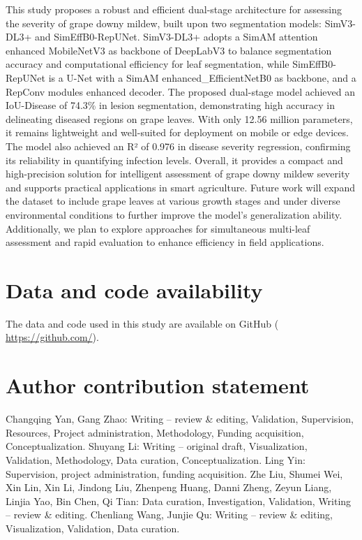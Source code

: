 \documentclass[
]{article}
\begin{document}
This study proposes a robust and efficient dual-stage architecture for
assessing the severity of grape downy mildew, built upon two
segmentation models: SimV3-DL3+ and SimEffB0-RepUNet. SimV3-DL3+ adopts
a SimAM attention enhanced MobileNetV3 as backbone of DeepLabV3 to
balance segmentation accuracy and computational efficiency for leaf
segmentation, while SimEffB0-RepUNet is a U-Net with a SimAM
enhanced\_EfficientNetB0 as backbone, and a RepConv modules enhanced
decoder. The proposed dual-stage model achieved an IoU-Disease of 74.3\%
in lesion segmentation, demonstrating high accuracy in delineating
diseased regions on grape leaves. With only 12.56 million parameters, it
remains lightweight and well-suited for deployment on mobile or edge
devices. The model also achieved an R² of 0.976 in disease severity
regression, confirming its reliability in quantifying infection levels.
Overall, it provides a compact and high-precision solution for
intelligent assessment of grape downy mildew severity and supports
practical applications in smart agriculture. Future work will expand the
dataset to include grape leaves at various growth stages and under
diverse environmental conditions to further improve the model's
generalization ability. Additionally, we plan to explore approaches for
simultaneous multi-leaf assessment and rapid evaluation to enhance
efficiency in field applications.

\hypertarget{data-and-code-availability}{%
\section{Data and code availability}\label{data-and-code-availability}}

The data and code used in this study are available on GitHub (
\href{https://github.com/husnxjsjsb/Grape-Downy}{https://github.com/}).

\hypertarget{author-contribution-statement}{%
\section{Author contribution
statement}\label{author-contribution-statement}}

Changqing Yan, Gang Zhao: Writing -- review \& editing, Validation,
Supervision, Resources, Project administration, Methodology, Funding
acquisition, Conceptualization. Shuyang Li: Writing -- original draft,
Visualization, Validation, Methodology, Data curation,
Conceptualization. Ling Yin: Supervision, project administration,
funding acquisition. Zhe Liu, Shumei Wei, Xin Lin, Xin Li, Jindong Liu,
Zhenpeng Huang, Danni Zheng, Zeyun Liang, Linjia Yao, Bin Chen, Qi Tian:
Data curation, Investigation, Validation, Writing -- review \& editing.
Chenliang Wang, Junjie Qu: Writing -- review \& editing, Visualization,
Validation, Data curation.
\end{document}
